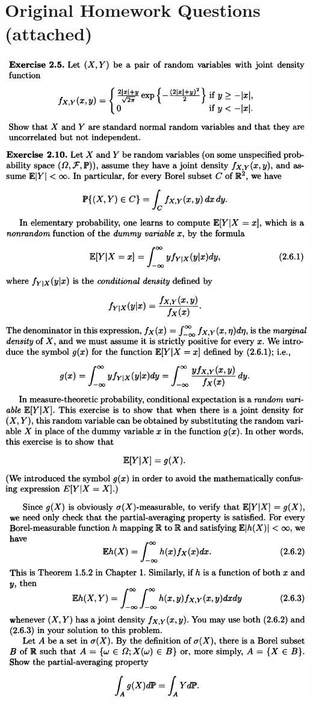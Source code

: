 \documentclass[final,3p,authoryear]{elsarticle}
\begin{document}
	
\appendix

\section{Original Homework Questions (attached)}
%	
	\includegraphics[width=14cm]{Ex2p5.png}\\
	\includegraphics[width=14cm]{Ex2p10s1.png}\\
	\includegraphics[width=14cm]{Ex2p10s2.png}\\
\end{document}
